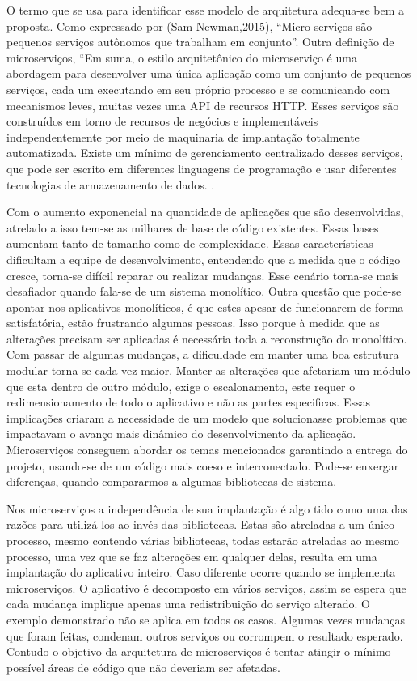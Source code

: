 O termo que se usa para identificar esse modelo de arquitetura adequa-se bem a proposta.
Como expressado por (Sam Newman,2015), “Micro-serviços são pequenos serviços autônomos que trabalham em conjunto”.
Outra definição de microserviços, “Em suma, o estilo arquitetônico do microserviço é uma abordagem para desenvolver
uma única aplicação como um conjunto de pequenos serviços, cada um executando em seu próprio processo e se comunicando 
com mecanismos leves, muitas vezes uma API de recursos HTTP. Esses serviços são construídos em torno de recursos de 
negócios e implementáveis independentemente por meio de maquinaria de implantação totalmente automatizada.
Existe um mínimo de gerenciamento centralizado desses serviços, que pode ser escrito em diferentes linguagens de 
programação e usar diferentes tecnologias de armazenamento de dados. \cite{martin-fowler-microservices}.


Com o aumento exponencial na quantidade de aplicações que são desenvolvidas, atrelado a isso tem-se as milhares de base 
de código existentes. Essas bases aumentam tanto de tamanho como de complexidade. Essas características dificultam a 
equipe de desenvolvimento, entendendo que a medida que o código cresce, torna-se difícil reparar ou realizar mudanças. 
Esse cenário torna-se mais desafiador quando fala-se de um sistema monolítico. Outra questão que pode-se apontar 
nos aplicativos monolíticos, é que estes apesar de funcionarem de forma satisfatória, estão frustrando algumas pessoas.
Isso porque à medida que as alterações precisam ser aplicadas é necessária toda a reconstrução do monolítico. Com passar 
de algumas mudanças, a dificuldade em manter uma boa estrutura modular torna-se cada vez maior. Manter as alterações 
que  afetariam um módulo que esta dentro de outro módulo, exige o escalonamento, este requer o redimensionamento de todo 
o aplicativo e não as partes especificas. Essas implicações criaram a necessidade de um modelo que solucionasse problemas 
que impactavam o avanço mais dinâmico do desenvolvimento da aplicação.
Microserviços conseguem abordar os temas mencionados garantindo a entrega do projeto, usando-se de um código mais coeso 
e interconectado.  Pode-se enxergar diferenças, quando compararmos a algumas bibliotecas de sistema.


Nos microserviços a independência de sua implantação é algo tido como uma das razões para utilizá-los ao invés das
bibliotecas. Estas são atreladas a um único processo, mesmo contendo várias bibliotecas, todas estarão atreladas ao mesmo
processo, uma vez que se faz alterações em qualquer delas, resulta em uma implantação do aplicativo inteiro. Caso diferente
ocorre quando se implementa microserviços. O aplicativo é decomposto em vários serviços, assim se espera que cada mudança
implique apenas uma redistribuição do serviço alterado. O exemplo demonstrado não se aplica em todos os casos. Algumas 
vezes mudanças que foram feitas, condenam outros serviços ou corrompem o resultado esperado. Contudo o objetivo da
arquitetura de microserviços é tentar atingir o mínimo possível áreas de código que não deveriam ser afetadas.


